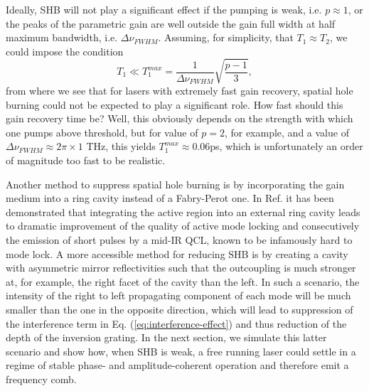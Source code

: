\documentclass[journal]{IEEEtran}
\begin{document}
	Ideally, SHB will not play a significant effect if the pumping is weak, i.e. $p\approx 1$, or the peaks of the parametric gain are well outside the gain full width at half maximum bandwidth, i.e. $\Delta\nu_{FWHM}$. Assuming, for simplicity, that $T_1 \approx T_2$, we could impose the condition 
	\begin{equation}
	T_1 \ll T_1^{max} = \frac{1}{\Delta\nu_{FWHM}}\sqrt{\frac{p-1}{3}},
	\end{equation}
	from where we see that for lasers with extremely fast gain recovery, spatial hole burning could not be expected to play a significant role. How fast should this gain recovery time be? Well, this obviously depends on the strength with which one pumps above threshold, but for value of $p=2$, for example, and a value of $\Delta\nu_{FWHM}\approx 2\pi\times 1$ THz, this yields $T_1^{max}\approx 0.06 $ps, which is unfortunately an order of magnitude too fast to be realistic. 
	
	Another method to suppress spatial hole burning is by incorporating the gain medium into a ring cavity instead of a Fabry-Perot one. In Ref. \cite{revin2016active} it has been demonstrated that integrating the active region into an external ring cavity leads to dramatic improvement of the quality of active mode locking and consecutively the emission of short pulses by a mid-IR QCL, known to be infamously hard to mode lock. A more accessible method for reducing SHB is by creating a cavity with asymmetric mirror reflectivities such that the outcoupling is much stronger at, for example, the right facet of the cavity than the left. In such a scenario, the intensity of the right to left propagating component of each mode will be much smaller than the one in the opposite direction, which will lead to suppression of the interference term in Eq. (\ref{eq:interference-effect}) and thus reduction of the depth of the inversion grating. In the next section, we simulate this latter scenario and show how, when SHB is weak, a free running laser could settle in a regime of stable phase- and amplitude-coherent operation and therefore emit a frequency comb.
	
\end{document}
